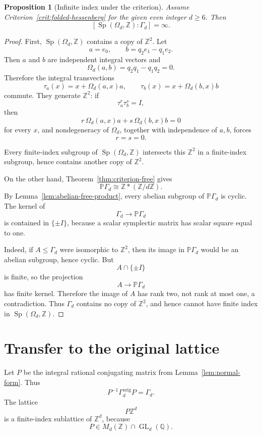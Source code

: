\documentclass[a4paper,11pt]{amsart}
\newcommand{\Z}{\mathbb Z}
\newcommand{\Q}{\mathbb Q}
\newcommand{\Pj}{\mathbb P}
\newcommand{\Sp}{\operatorname{Sp}}
\newcommand{\GL}{\operatorname{GL}}
\newtheorem{proposition}[theorem]{Proposition}
\theoremstyle{remark}
\numberwithin{equation}{section}
\begin{document}
\begin{proposition}[Infinite index under the criterion]\label{prop:infinite-index}
Assume Criterion~\ref{crit:folded-hessenberg} for the given even integer \(d\geq6\). Then
\[
[\Sp(\Omega_d,\Z):\Gamma_d]=\infty.
\]
\end{proposition}

\begin{proof}
First, \(\Sp(\Omega_d,\Z)\) contains a copy of \(\Z^2\). Let
\[
a=e_0,
\qquad
b=q_2e_1-q_1e_2.
\]
Then \(a\) and \(b\) are independent integral vectors and
\[
\Omega_d(a,b)=q_2q_1-q_1q_2=0.
\]
Therefore the integral transvections
\[
\tau_a(x)=x+\Omega_d(a,x)a,
\qquad
\tau_b(x)=x+\Omega_d(b,x)b
\]
commute. They generate \(\Z^2\): if
\[
\tau_a^r\tau_b^s=I,
\]
then
\[
r\,\Omega_d(a,x)a+s\,\Omega_d(b,x)b=0
\]
for every \(x\), and nondegeneracy of \(\Omega_d\), together with independence of \(a,b\), forces
\[
r=s=0.
\]

Every finite-index subgroup of \(\Sp(\Omega_d,\Z)\) intersects this \(\Z^2\) in a finite-index subgroup, hence contains another copy of \(\Z^2\).

On the other hand, Theorem~\ref{thm:criterion-free} gives
\[
\Pj\Gamma_d\cong \Z*(\Z/d\Z).
\]
By Lemma~\ref{lem:abelian-free-product}, every abelian subgroup of \(\Pj\Gamma_d\) is cyclic. The kernel of
\[
\Gamma_d\longrightarrow \Pj\Gamma_d
\]
is contained in \(\{\pm I\}\), because a scalar symplectic matrix has scalar square equal to one.

Indeed, if \(A\leq\Gamma_d\) were isomorphic to \(\Z^2\), then its image in \(\Pj\Gamma_d\) would be an abelian subgroup, hence cyclic. But
\[
A\cap\{\pm I\}
\]
is finite, so the projection
\[
A\longrightarrow\Pj\Gamma_d
\]
has finite kernel. Therefore the image of \(A\) has rank two, not rank at most one, a contradiction. Thus \(\Gamma_d\) contains no copy of \(\Z^2\), and hence cannot have finite index in \(\Sp(\Omega_d,\Z)\).
\end{proof}

\section{Transfer to the original lattice}

Let \(P\) be the integral rational conjugating matrix from Lemma~\ref{lem:normal-form}. Thus
\[
P^{-1}\Gamma_d^{\mathrm{orig}}P=\Gamma_d.
\]
The lattice
\[
P\Z^d
\]
is a finite-index sublattice of \(\Z^d\), because
\[
P\in M_d(\Z)\cap\GL_d(\Q).
\]
\end{document}
